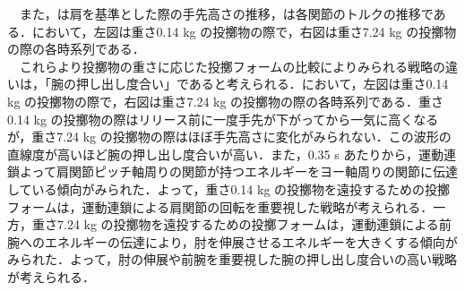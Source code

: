 \begin{small}
　また，は肩を基準とした際の手先高さの推移，は各関節のトルクの推移である．において，左図は重さ0.14 kg の投擲物の際で，右図は重さ7.24 kg の投擲物の際の各時系列である．\\
　これらより投擲物の重さに応じた投擲フォームの比較によりみられる戦略の違いは，「腕の押し出し度合い」であると考えられる．において，左図は重さ0.14 kg の投擲物の際で，右図は重さ7.24 kg の投擲物の際の各時系列である．重さ0.14 kg の投擲物の際はリリース前に一度手先が下がってから一気に高くなるが，重さ7.24 kg の投擲物の際はほぼ手先高さに変化がみられない．この波形の直線度が高いほど腕の押し出し度合いが高い．また，0.35 s あたりから，運動連鎖よって肩関節ピッチ軸周りの関節が持つエネルギーをヨー軸周りの関節に伝達している傾向がみられた．よって，重さ0.14 kg の投擲物を遠投するための投擲フォームは，運動連鎖による肩関節の回転を重要視した戦略が考えられる．一方，重さ7.24 kg の投擲物を遠投するための投擲フォームは，運動連鎖による前腕へのエネルギーの伝達により，肘を伸展させるエネルギーを大きくする傾向がみられた．よって，肘の伸展や前腕を重要視した腕の押し出し度合いの高い戦略が考えられる．

\end{small}
